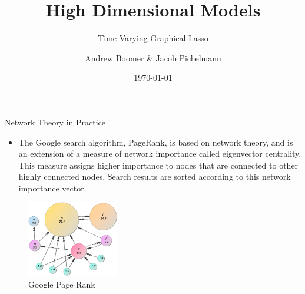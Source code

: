 \documentclass{beamer}
\title[High Dimensional Models] %
{High Dimensional Models}
\subtitle{Time-Varying Graphical Lasso}
\author[Andrew Boomer \& Jacob Pichelmann] %
{Andrew Boomer \& Jacob Pichelmann}
\institute []
{Toulouse School of Economics \\ M2 EEE}
\date{\today}
\begin{document}
\frame{\titlepage}

\begin{frame}{Network Theory in Practice \cite{page1999pagerank}}
	\begin{itemize}
		\item The Google search algorithm, PageRank, is based on network theory, and is an extension of a measure of network
        importance called eigenvector centrality.
        This measure assigns higher importance to nodes that are connected to other highly connected nodes.
        Search results are sorted according to this network importance vector.
	\end{itemize}

        \begin{figure}
       \includegraphics[width=4cm]{PageRankExample}
       \caption{Google Page Rank}
       \source{}
       \label{fig:PageRank}
  \end{figure}
\end{frame}
    
\end{document}
